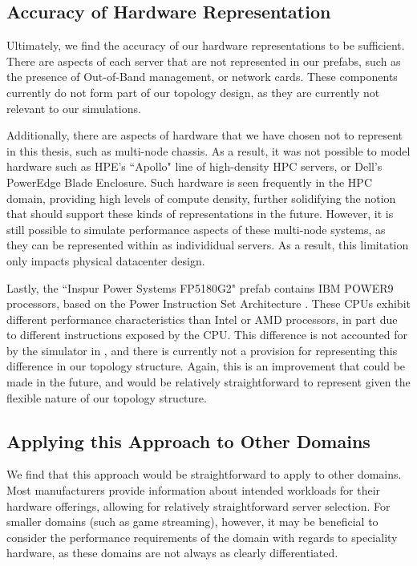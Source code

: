 \documentclass[11pt]{article}
\begin{document}
	\subsection{Accuracy of Hardware Representation}
		Ultimately, we find the accuracy of our hardware representations to be sufficient.
		There are aspects of each server that are not represented in our prefabs, such as the presence of Out-of-Band management, or network cards.
		These components currently do not form part of our topology design, as they are currently not relevant to our simulations.

		Additionally, there are aspects of hardware that we have chosen not to represent in this thesis, such as multi-node chassis.
		As a result, it was not possible to model hardware such as HPE's ``Apollo" line of high-density HPC servers, or Dell's PowerEdge Blade Enclosure.
		Such hardware is seen frequently in the HPC domain, providing high levels of compute density, further solidifying the notion that \opendc{} should support these kinds of representations in the future.
		However, it is still possible to simulate performance aspects of these multi-node systems, as they can be represented within \opendc{} as individidual servers.
		As a result, this limitation only impacts physical datacenter design.

		Lastly, the ``Inspur Power Systems FP5180G2" prefab contains IBM POWER9 processors, based on the Power Instruction Set Architecture \cite{IBM2017}.
		These CPUs exhibit different performance characteristics than Intel or AMD processors, in part due to different instructions exposed by the CPU.
		This difference is not accounted for by the simulator in \opendc{}, and there is currently not a provision for representing this difference in our topology structure.
		Again, this is an improvement that could be made in the future, and would be relatively straightforward to represent given the flexible nature of our topology structure.


	\subsection{Applying this Approach to Other Domains}
		We find that this approach would be straightforward to apply to other domains.
		Most manufacturers provide information about intended workloads for their hardware offerings, allowing for relatively straightforward server selection.
		For smaller domains (such as game streaming), however, it may be beneficial to consider the performance requirements of the domain with regards to speciality hardware, as these domains are not always as clearly differentiated.
\end{document}
